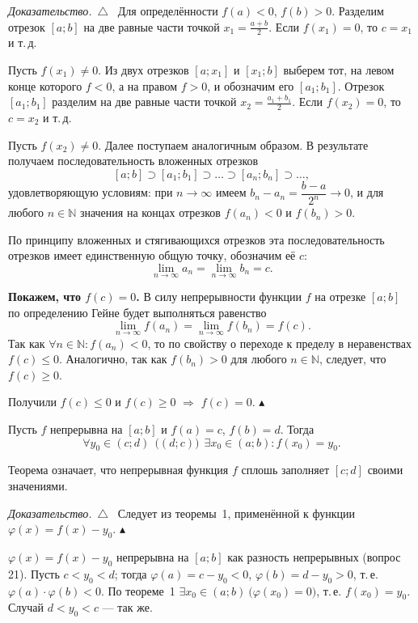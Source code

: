 \documentclass[a4paper,11pt]{article}
\newenvironment{dok}
  {\par\smallskip\noindent\textit{Доказательство.}\ $\triangle$\ \ignorespaces}
  {\unskip\nobreak\hfill$\blacktriangle$\par\smallskip}
\begin{document}
\begin{dok}
Для определённости $f(a) < 0$, $f(b) > 0$. Разделим отрезок $[a; b]$ на две равные части точкой
$x_1 = \frac{a + b}{2}$. Если $f(x_1) = 0$, то $c = x_1$ и т.\,д.

Пусть $f(x_1) \ne 0$. Из двух отрезков $[a; x_1]$ и $[x_1; b]$ выберем тот, на левом конце которого
$f < 0$, а на правом $f > 0$, и обозначим его $[a_1; b_1]$. Отрезок $[a_1; b_1]$ разделим на две равные
части точкой $x_2 = \frac{a_1 + b_1}{2}$. Если $f(x_2) = 0$, то $c = x_2$ и т.\,д.

Пусть $f(x_2) \ne 0$. Далее поступаем аналогичным образом. В результате получаем последовательность
вложенных отрезков
\[
  [a; b] \supset [a_1; b_1] \supset \dots \supset [a_n; b_n] \supset \dots,
\]
удовлетворяющую условиям: при $n \to \infty$ имеем $b_n - a_n = \dfrac{b - a}{2^n} \to 0$,
и для любого $n \in \mathbb{N}$ значения на концах отрезков $f(a_n) < 0$ и $f(b_n) > 0$.

По принципу вложенных и стягивающихся отрезков эта последовательность отрезков имеет единственную
общую точку, обозначим её $c$:
\[
  \lim_{n \to \infty} a_n = \lim_{n \to \infty} b_n = c.
\]

\textbf{Покажем, что $f(c) = 0$.} В силу непрерывности функции $f$ на отрезке $[a; b]$ по определению
Гейне будет выполняться равенство
\[
  \lim_{n \to \infty} f(a_n) = \lim_{n \to \infty} f(b_n) = f(c).
\]
Так как $\forall n \in \mathbb{N}\colon f(a_n) < 0$, то по свойству о переходе к пределу в неравенствах
$f(c) \le 0$. Аналогично, так как $f(b_n) > 0$ для любого $n \in \mathbb{N}$, следует, что $f(c) \ge 0$.

Получили $f(c) \le 0$ и $f(c) \ge 0$ $\Longrightarrow$ $f(c) = 0$.
\end{dok}

\begin{teo}
Пусть $f$ непрерывна на $[a; b]$ и $f(a) = c$, $f(b) = d$. Тогда
\[
  \forall y_0 \in (c; d)\ \ \bigl((d; c)\bigr)\ \ \exists x_0 \in (a; b)\colon f(x_0) = y_0.
\]
\end{teo}

Теорема означает, что непрерывная функция $f$ сплошь заполняет $[c; d]$ своими значениями.

\begin{dok}
Следует из теоремы~1, применённой к функции $\varphi(x) = f(x) - y_0$.
\end{dok}

\begin{dop}
$\varphi(x) = f(x) - y_0$ непрерывна на $[a; b]$ как разность непрерывных (вопрос 21). Пусть $c < y_0 < d$; тогда
$\varphi(a) = c - y_0 < 0$, $\varphi(b) = d - y_0 > 0$, т.\,е. $\varphi(a) \cdot \varphi(b) < 0$. По теореме~1
$\exists x_0 \in (a; b)\ \bigl(\varphi(x_0) = 0\bigr)$, т.\,е. $f(x_0) = y_0$. Случай $d < y_0 < c$ --- так же.
\end{dop}
\end{document}
